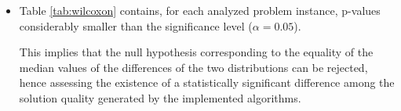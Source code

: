 \begin{itemize}
      



\item Table \ref{tab:wilcoxon} contains, for each analyzed problem instance, p-values considerably smaller than the significance level ($\alpha=0.05$). 

This implies that the null hypothesis corresponding to the equality of the median values of the differences of the two distributions can be rejected, hence assessing the existence of a statistically significant difference among the solution quality generated by the implemented algorithms.


\end{itemize}


